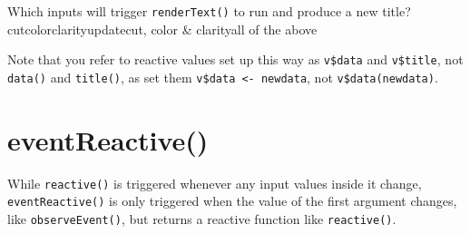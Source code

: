 \documentclass[
  oneside]{book}
\begin{document}
Which inputs will trigger \texttt{renderText}\texttt{()} to run and produce a new title?\\
cutcolorclarityupdatecut, color \& clarityall of the above

\begin{warning}
Note that you refer to reactive values set up this way as \texttt{v\$data} and \texttt{v\$title}, not \texttt{data}\texttt{()} and \texttt{title}\texttt{()}, as set them \texttt{v\$data\ \textless{}-\ newdata}, not \texttt{v\$data(newdata)}.

\end{warning}

\hypertarget{eventreactive}{%
\section{eventReactive()}\label{eventreactive}}

While \texttt{reactive}\texttt{()} is triggered whenever any input values inside it change, \texttt{eventReactive}\texttt{()} is only triggered when the value of the first argument changes, like \texttt{observeEvent}\texttt{()}, but returns a reactive function like \texttt{reactive}\texttt{()}.
\end{document}
